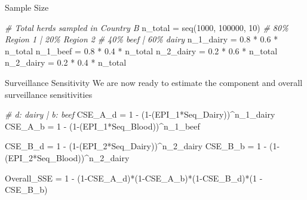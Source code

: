 \documentclass[
  ignorenonframetext,
]{beamer}
\newenvironment{Shaded}{\begin{snugshade}}{\end{snugshade}}
\newcommand{\CommentTok}[1]{\textcolor[rgb]{0.56,0.35,0.01}{\textit{#1}}}
\newcommand{\DecValTok}[1]{\textcolor[rgb]{0.00,0.00,0.81}{#1}}
\newcommand{\FloatTok}[1]{\textcolor[rgb]{0.00,0.00,0.81}{#1}}
\newcommand{\FunctionTok}[1]{\textcolor[rgb]{0.00,0.00,0.00}{#1}}
\newcommand{\NormalTok}[1]{#1}
\newcommand{\OtherTok}[1]{\textcolor[rgb]{0.56,0.35,0.01}{#1}}
\newcommand{\SpecialCharTok}[1]{\textcolor[rgb]{0.00,0.00,0.00}{#1}}
\begin{document}
\begin{frame}[fragile]{Sample Size}
\protect\hypertarget{sample-size}{}
\begin{Shaded}
\begin{Highlighting}[]
\CommentTok{\# Total herds sampled in Country B}
\NormalTok{n\_total }\OtherTok{=} \FunctionTok{seq}\NormalTok{(}\DecValTok{1000}\NormalTok{, }\DecValTok{100000}\NormalTok{, }\DecValTok{10}\NormalTok{)}
\CommentTok{\# 80\% Region 1 | 20\% Region 2}
\CommentTok{\# 40\% beef | 60\% dairy}
\NormalTok{n\_1\_dairy }\OtherTok{=} \FloatTok{0.8} \SpecialCharTok{*} \FloatTok{0.6} \SpecialCharTok{*}\NormalTok{ n\_total}
\NormalTok{n\_1\_beef }\OtherTok{=} \FloatTok{0.8} \SpecialCharTok{*} \FloatTok{0.4} \SpecialCharTok{*}\NormalTok{ n\_total}
\NormalTok{n\_2\_dairy }\OtherTok{=} \FloatTok{0.2} \SpecialCharTok{*} \FloatTok{0.6} \SpecialCharTok{*}\NormalTok{ n\_total}
\NormalTok{n\_2\_dairy }\OtherTok{=} \FloatTok{0.2} \SpecialCharTok{*} \FloatTok{0.4} \SpecialCharTok{*}\NormalTok{ n\_total}
\end{Highlighting}
\end{Shaded}
\end{frame}

\begin{frame}[fragile]{Surveillance Sensitivity}
\protect\hypertarget{surveillance-sensitivity}{}
We are now ready to estimate the component and overall surveillance
sensitivities

\begin{Shaded}
\begin{Highlighting}[]
\CommentTok{\# d: dairy | b: beef}
\NormalTok{CSE\_A\_d }\OtherTok{=} \DecValTok{1} \SpecialCharTok{{-}}\NormalTok{ (}\DecValTok{1}\SpecialCharTok{{-}}\NormalTok{(EPI\_1}\SpecialCharTok{*}\NormalTok{Seq\_Dairy))}\SpecialCharTok{\^{}}\NormalTok{n\_1\_dairy}
\NormalTok{CSE\_A\_b }\OtherTok{=} \DecValTok{1} \SpecialCharTok{{-}}\NormalTok{ (}\DecValTok{1}\SpecialCharTok{{-}}\NormalTok{(EPI\_1}\SpecialCharTok{*}\NormalTok{Seq\_Blood))}\SpecialCharTok{\^{}}\NormalTok{n\_1\_beef}

\NormalTok{CSE\_B\_d }\OtherTok{=} \DecValTok{1} \SpecialCharTok{{-}}\NormalTok{ (}\DecValTok{1}\SpecialCharTok{{-}}\NormalTok{(EPI\_2}\SpecialCharTok{*}\NormalTok{Seq\_Dairy))}\SpecialCharTok{\^{}}\NormalTok{n\_2\_dairy}
\NormalTok{CSE\_B\_b }\OtherTok{=} \DecValTok{1} \SpecialCharTok{{-}}\NormalTok{ (}\DecValTok{1}\SpecialCharTok{{-}}\NormalTok{(EPI\_2}\SpecialCharTok{*}\NormalTok{Seq\_Blood))}\SpecialCharTok{\^{}}\NormalTok{n\_2\_dairy}

\NormalTok{Overall\_SSE }\OtherTok{=} \DecValTok{1} \SpecialCharTok{{-}} 
\NormalTok{  (}\DecValTok{1}\SpecialCharTok{{-}}\NormalTok{CSE\_A\_d)}\SpecialCharTok{*}\NormalTok{(}\DecValTok{1}\SpecialCharTok{{-}}\NormalTok{CSE\_A\_b)}\SpecialCharTok{*}\NormalTok{(}\DecValTok{1}\SpecialCharTok{{-}}\NormalTok{CSE\_B\_d)}\SpecialCharTok{*}\NormalTok{(}\DecValTok{1} \SpecialCharTok{{-}}\NormalTok{ CSE\_B\_b)}
\end{Highlighting}
\end{Shaded}
\end{frame}
\end{document}
